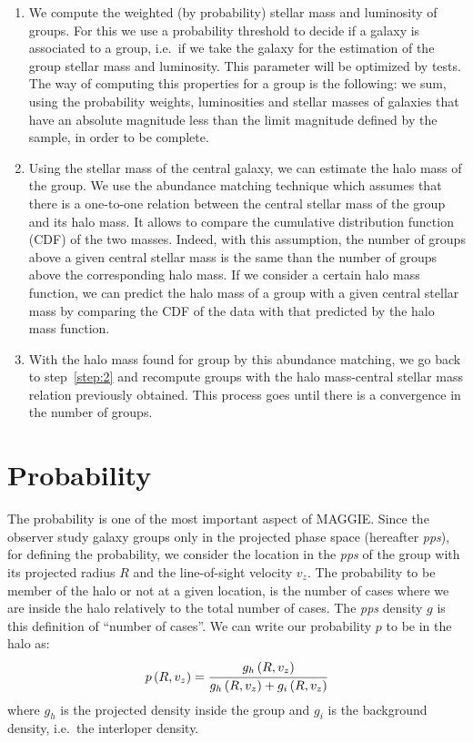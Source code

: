 \begin{enumerate}
    \item We compute the weighted (by probability) stellar mass and
        luminosity of groups. For this we use a probability threshold to
        decide if a galaxy is associated to a group, i.e.\ if we take the
        galaxy for the estimation of the group stellar mass and luminosity.
        This parameter will be optimized by tests. The way of computing this
        properties for a group is the following: we sum, using the
        probability weights, luminosities and stellar masses of galaxies
        that have an absolute magnitude less than the limit magnitude
        defined by the sample, in order to be complete.

    \item Using the stellar mass of the central galaxy, we can estimate the
        halo mass of the group. We use the abundance matching technique
        which assumes that there is a one-to-one relation between the
        central stellar mass of the group and its halo mass. It allows to
        compare the cumulative distribution function (CDF) of the two
        masses. Indeed, with this assumption, the number of groups above a
        given central stellar mass is the same than the number of groups
        above the corresponding halo mass. If we consider a certain halo
        mass function, we can predict the halo mass of a group with a given
        central stellar mass by comparing the CDF of the data with that
        predicted by the halo mass function.

    \item With the halo mass found for group by this abundance matching, we
        go back to step~\ref{step:2} and recompute groups with the halo
        mass-central stellar mass relation previously obtained. This process
        goes until there is a convergence in the number of groups.
\end{enumerate}

\section{Probability}
\label{sec:probability}

The probability is one of the most important aspect of MAGGIE\@. Since the
observer study galaxy groups only in the projected phase space (hereafter
\emph{pps}), for defining the probability, we consider the location in
the \emph{pps} of the group with its projected radius $R$ and the
line-of-sight velocity $v_z$. The probability to be member of the halo or
not at a given location, is the number of cases where we are inside the halo
relatively to the total number of cases. The \emph{pps} density $g$ is this
definition of ``number of cases''. We can write our probability $p$ to be in
the halo as:
%
\begin{equation}
    \label{eq:probability}
    p \left(R, v_z\right)= \cfrac{g_h \left(R, v_z\right)}
    {g_h \left(R, v_z\right) + g_i \left(R, v_z\right)}
\end{equation}
%
where $g_h$ is the projected density inside the group and $g_i$ is the
background density, i.e.\ the interloper density.


